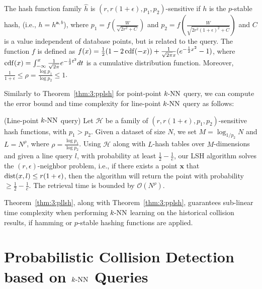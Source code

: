 \begin{theorem}
  \label{thm:3:pstablehash}
  The hash function family $\hat{h}$ is $(r, r(1+\epsilon), p_1, p_2)$-sensitive if $h$ is the $p$-stable hash, (i.e., $h = h^{\mathbf a, b}$), where $p_1 = f(\frac{W}{\sqrt{2r^2+C}})$ and $p_2 = f(\frac{W}{\sqrt{2r^2(1+\epsilon)^2+C}})$ and $C$ is a value independent of database points, but is related to the query. The function $f$ is defined as $f(x) = \frac{1}{2}(1 - 2 \operatorname{cdf}(-x)) + \frac{1}{\sqrt{2\pi} x} (e^{-\frac{1}{2}x^2} - 1)$, where $\operatorname{cdf}(x) = \int_{-\infty}^{x} \frac{1}{\sqrt{2\pi}}e^{-\frac{1}{2}t^2}dt$ is a cumulative distribution function. Moreover, $\frac{1}{1+\epsilon} \leq \rho = \frac{\log p_1}{\log p_2} \leq 1$.
\end{theorem}


Similarly to Theorem~\ref{thm:3:pplsh} for point-point $k\text{-NN}$ query, we can compute the error bound and time complexity for line-point $k\text{-NN}$ query as follows:
\begin{theorem}
  \label{thm:3:pllsh}
  (Line-point $k\text{-NN}$ query) Let $\mathcal H$ be a family of $(r, r(1+\epsilon), p_1, p_2)$-sensitive hash functions, with $p_1 > p_2$. Given a dataset of size $N$, we set $M = \log_{1/p_2} N$ and $L = N^{\rho}$, where $\rho = \frac{\log p_1}{\log p_2}$. Using $\mathcal H$ along with $L$-hash tables over $M$-dimensions and given a line query $l$, with probability at least $\frac{1}{2} - \frac{1}{e}$, our LSH algorithm solves the $(r, \epsilon)$-neighbor problem, i.e., if there exists a point $\mathbf x$ that $\operatorname{dist}(x, l) \leq r(1+\epsilon)$, then the algorithm will return the point with probability $\geq \frac{1}{2} - \frac{1}{e}$. The retrieval time is bounded by $\mathcal O(N^{\rho})$.
\end{theorem}


Theorem~\ref{thm:3:pllsh}, along with Theorem~\ref{thm:3:pplsh}, guarantees sub-linear time complexity when performing $k\text{-NN}$ learning on the historical collision results, if hamming or $p$-stable hashing functions are applied.


\section{Probabilistic Collision Detection based on $k\text{-NN}$ Queries}
\label{sec:3:knnreasoning}

